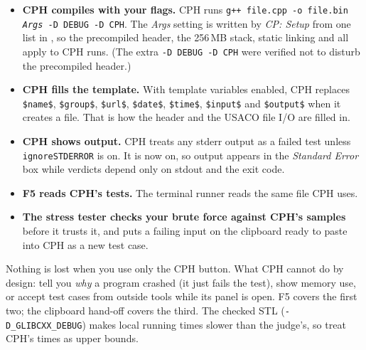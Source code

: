 \begin{itemize}
  \item \textbf{CPH compiles with your flags.} CPH runs \texttt{g++ file.cpp -o file.bin \emph{Args} -D DEBUG -D CPH}.
        The \emph{Args} setting is written by \emph{CP: Setup} from one list in , so the precompiled
        header, the 256\,MB stack, static linking and  all apply to CPH runs.
        (The extra \texttt{-D DEBUG -D CPH} were verified not to disturb the precompiled header.)
  \item \textbf{CPH fills the template.} With template variables enabled, CPH replaces \texttt{\$name\$},
        \texttt{\$group\$}, \texttt{\$url\$}, \texttt{\$date\$}, \texttt{\$time\$}, \texttt{\$input\$} and
        \texttt{\$output\$} when it creates a file. That is how the header and the USACO file I/O are filled in.
  \item \textbf{CPH shows  output.} CPH treats any stderr output as a failed test unless
        \texttt{ignoreSTDERROR} is on. It is now on, so  output appears in the \emph{Standard Error}
        box while verdicts depend only on stdout and the exit code.
  \item \textbf{F5 reads CPH's tests.} The terminal runner reads the same  file CPH uses.
  \item \textbf{The stress tester checks your brute force against CPH's samples} before it trusts it, and puts a
        failing input on the clipboard ready to paste into CPH as a new test case.
\end{itemize}

\begin{fact}
Nothing is lost when you use only the CPH button. What CPH cannot do by design: tell you \emph{why} a program
crashed (it just fails the test), show memory use, or accept test cases from outside tools while its panel is open.
F5 covers the first two; the clipboard hand-off covers the third. The checked STL (\texttt{-D\_GLIBCXX\_DEBUG}) makes
local running times slower than the judge's, so treat CPH's times as upper bounds.
\end{fact}
